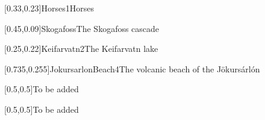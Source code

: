 



\graphicspath{{Figures/}{Figures/Iceland/}}


\subtitle{Day 3}
\date{28.10.2020}


    
    [0.33,0.23]{Horses1}{Horses}
    
    
    [0.45,0.09]{Skogafoss}{The Skogafoss cascade}
    
    [0.25,0.22]{Keifarvatn2}{The Keifarvatn lake}
    
    [0.735,0.255]{JokursarlonBeach4}{The volcanic beach of the J\"okurs\'arl\'on}
    
    [0.5,0.5]{}{To be added}
    
    [0.5,0.5]{}{To be added}
    

